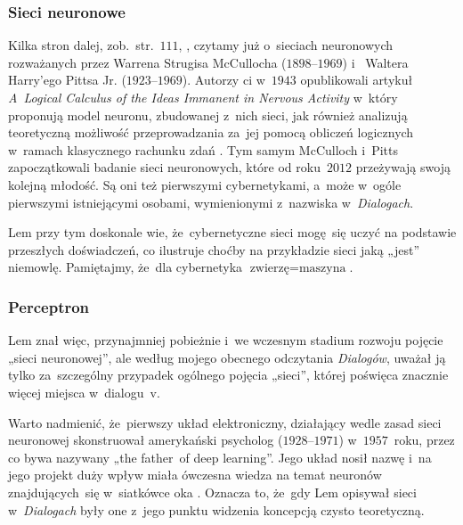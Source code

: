 \documentclass[10pt,t]{beamer}
\begin{document}
\begin{frame}
  \frametitle{Sieci neuronowe}


  Kilka stron dalej, zob.~str.~$111$,
  \parencite{Lem-Dialogi-Vol-I-Pub-1996}, czytamy już o~sieciach
  neuronowych rozważanych przez
  {Warrena Strugisa McCullocha} ($1898\text{--}1969$)
  i~
  {Waltera Harry’ego Pittsa Jr.} ($1923\text{--}1969$). Autorzy ci w~$1943$
  opublikowali artykuł \textit{A~Logical Calculus of the Ideas Immanent in
    Nervous Activity} w~który proponują model neuronu, zbudowanej z~nich
  sieci, jak również analizują teoretyczną możliwość przeprowadzania za~jej
  pomocą obliczeń logicznych w~ramach klasycznego rachunku zdań
  \parencite{Bielecki-Sztuczne-sieci-neuronowe-Slowniki-ETC-Vol-XIII-Ver-2025}.
  Tym samym McCulloch i~Pitts zapoczątkowali badanie sieci neuronowych,
  które od roku~$2012$ przeżywają swoją kolejną młodość. Są oni też
  pierwszymi cybernetykami, a~może w~ogóle pierwszymi istniejącymi osobami,
  wymienionymi z~nazwiska w~\textit{Dialogach}.

  Lem przy tym doskonale wie, że~cybernetyczne sieci mogę~się uczyć na
  podstawie przeszłych doświadczeń, co ilustruje choćby na przykładzie
  sieci jaką „jest” niemowlę. Pamiętajmy, że~dla cybernetyka
  $\text{zwierzę} = \text{maszyna}$.

\end{frame}





\begin{frame}
  \frametitle{Perceptron}


  Lem znał więc, przynajmniej pobieżnie i~we wczesnym stadium rozwoju
  pojęcie „sieci neuronowej”, ale według mojego obecnego odczytania
  \textit{Dialogów}, uważał ją tylko za~szczególny przypadek ogólnego
  pojęcia „sieci”, której poświęca znacznie więcej miejsca w~dialogu~v.

   Warto nadmienić, że~pierwszy układ elektroniczny, działający
  wedle zasad sieci neuronowej skonstruował amerykański psycholog
   ($1928\text{--}1971$) w~$1957$~roku, przez co bywa nazywany
  „the father~of deep learning”. Jego układ nosił nazwę
  i~na jego projekt duży wpływ miała ówczesna wiedza na temat neuronów
  znajdujących~się w~siatkówce oka
  \parencite{Bielecki-Sztuczne-sieci-neuronowe-Slowniki-ETC-Vol-XIII-Ver-2025}. Oznacza to, że~gdy Lem opisywał sieci w~\textit{Dialogach} były
  one z~jego punktu widzenia koncepcją czysto teoretyczną.

\end{frame}
\end{document}
